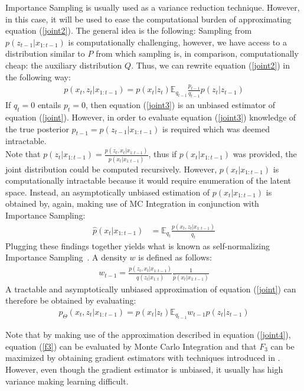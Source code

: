 Importance Sampling is usually used as a variance reduction technique. However, in this case, it will be used to ease the computational burden of approximating equation (\ref{joint2}). The general idea is the following: Sampling from $p(z_{t-1} | x_{1:t-1})$ is computationally challenging, however, we have access to a distribution similar to $P$ from which sampling is, in comparison, computationally cheap: the auxiliary distribution $Q$. Thus, we can rewrite equation (\ref{joint2}) in the following way:
\begin{align}
p(x_t,z_t|x_{1:t-1}) = p(x_t|z_t) \mathbb E_{q_{t-1}} \frac{p_{t-1}}{q_{t-1}} p(z_t|z_{t-1})  \label{joint3}
\end{align}
If $q_t = 0$ entails $p_t = 0$, then equation (\ref{joint3}) is an unbiased estimator of equation (\ref{joint}). However, in order to evaluate equation (\ref{joint3}) knowledge of the true posterior $p_{t-1} = p(z_{t-1} | x_{1:t-1})$ is required which was deemed intractable.\\
Note that $p(z_t | x_{1:t-1}) = \frac{p(z_t, x_t | x_{1:t-1})}{p(x_t | x_{1:t-1})}$, thus if $p(x_t | x_{1:t-1})$ was provided, the joint distribution could be computed recursively. However, $p(x_t | x_{1:t-1})$ is computationally intractable because it would require enumeration of the latent space. Instead, an asymptotically unbiased estimation of $p(x_t | x_{1:t-1})$ is obtained by, again, making use of MC Integration in conjunction with Importance Sampling:
\begin{align*}
\hat{p}(x_t | x_{1:t-1}) &= \mathbb E_{q_{t}} \frac{p(x_t, z_t | x_{1:t-1})}{q_t}
\end{align*}
Plugging these findings together yields what is known as self-normalizing Importance Sampling~\cite{mcbook}. A density $w$ is defined as follows:
\begin{align}
w_{t-1} = \frac{p(z_t, x_t | x_{1:t-1})}{ q(z_t | x_{1:t})} \frac{1}{\hat{p}(x_t | x_{1:t-1})} \label{W}
\end{align}
A tractable and asymptotically unbiased approximation of equation (\ref{joint}) can therefore be obtained by evaluating:
\begin{align}
p_\Theta(x_t,z_t|x_{1:t-1}) = p(x_t|z_t) \mathbb E_{q_{t-1}} w_{t-1} p(z_t|z_{t-1})  \label{joint4}
\end{align}

Note that by making use of the approximation described in equation (\ref{joint4}), equation (\ref{f3}) can be evaluated by Monte Carlo Integration and that $F_3$ can be maximized by obtaining gradient estimators with techniques introduced in \cite{ranganath2014black}. However, even though the gradient estimator is unbiased, it usually has high variance making learning difficult.

